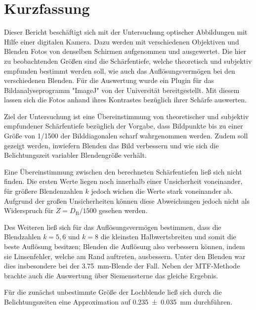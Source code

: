 \section{Kurzfassung}

	Dieser Bericht beschäftigt sich mit der Untersuchung optischer Abbildungen mit Hilfe einer digitalen Kamera.
	Dazu werden mit verschiedenen Objektiven und Blenden Fotos von denselben Schirmen aufgenommen und ausgewertet.
	Die hier zu beobachtenden Größen sind die Schärfentiefe, welche theoretisch und subjektiv empfunden bestimmt werden soll, wie auch das Auflösungsvermögen bei den verschiedenen Blenden.
	Für die Auswertung wurde ein Plugin für das Bildanalyseprogramm "ImageJ" von der Universität bereitgestellt.
	Mit diesem lassen sich die Fotos anhand ihres Kontrastes bezüglich ihrer Schärfe auswerten.
	
	Ziel der Untersuchung ist eine Übereinstimmung von theoretischer und subjektiv empfundener Schärfentiefe bezüglich der Vorgabe, dass Bildpunkte bis zu einer Größe von 1/1500 der Bilddiagonalen scharf wahrgenommen werden.
	Zudem soll gezeigt werden, inwiefern Blenden das Bild verbessern und wie sich die Belichtungszeit variabler Blendengröße verhält.
	
	Eine Übereinstimmung zwischen den berechneten Schärfentiefen ließ sich nicht finden.
	Die ersten Werte liegen noch innerhalb einer Unsicherheit voneinander, für größere Blendenzahlen $k$ jedoch wichen die Werte stark voneinander ab.
	Aufgrund der großen Unsicherheiten können diese Abweichungen jedoch nicht als Widerspruch für $Z = D_\text{B}/1500$ gesehen werden.
	
	Des Weiteren ließ sich für das Auflösungsvermögen bestimmen, dass die Blendzahlen $k = 5,6$ und $k = 8$ die kleinsten Halbwertsbreiten und somit die beste Auflösung besitzen; Blenden die Auflösung also verbessern können, indem sie Linsenfehler, welche am Rand auftreten, ausbessern.
	Unter den Blenden war dies insbesondere bei der \SI{3,75}{\milli\meter}-Blende der Fall.
	Neben der MTF-Methode brachte auch die Auswertung über Siemenssterne das gleiche Ergebnis.
	
	Für die zunächst unbestimmte Größe der Lochblende ließ sich durch die Belichtungszeiten eine Approximation auf \SI{0,235+-0,035}{\milli\meter} durchführen. 

